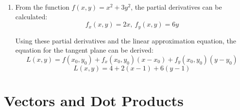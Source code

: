 \documentclass{article}
\begin{document}
\begin{enumerate}[1.]
  \item From the function $f(x, y) = x^{2} + 3y^{2}$, the partial derivatives
    can be calculated:
    $$ f_{x}(x, y) = 2x,\ f_{y}(x, y) = 6y $$

    Using these partial derivatives and the linear approximation equation, the
    equation for the tangent plane can be derived:
    $$ L(x, y) = f(x_{0}, y_{0}) + f_{x}(x_{0}, y_{0})(x - x_{0}) + f_{y}(x_{0},
    y_{0})(y - y_{0}) $$
    $$ L(x, y) = 4 + 2(x - 1) + 6(y - 1) $$

\end{enumerate}

\section{Vectors and Dot Products}
\end{document}
